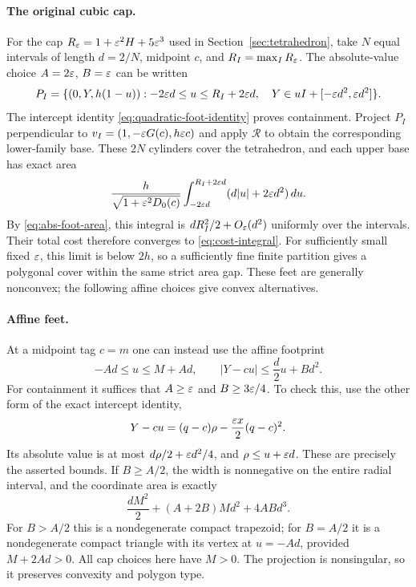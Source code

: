 \paragraph{The original cubic cap.}
For the cap $R_\varepsilon=1+\varepsilon^2H+5\varepsilon^3$ used in
Section~\ref{sec:tetrahedron}, take $N$ equal intervals of length $d=2/N$,
midpoint $c$, and $R_I=\max_I R_\varepsilon$. The absolute-value choice
$A=2\varepsilon$, $B=\varepsilon$ can be written
\begin{equation}\label{eq:polygonal-foot}
 P_I=\{(0,Y,h(1-u)):
    -2\varepsilon d\le u\le R_I+2\varepsilon d,\quad
    Y\in uI+[-\varepsilon d^2,\varepsilon d^2]\}.
\end{equation}
The intercept identity \eqref{eq:quadratic-foot-identity} proves containment.
Project $P_I$ perpendicular to $v_I=(1,-\varepsilon G(c),h\varepsilon c)$ and apply
$\mathcal R$ to obtain the corresponding lower-family base. These $2N$
cylinders cover the tetrahedron, and each upper base has exact area
\begin{equation}\label{eq:polygonal-area}
 \frac{h}{\sqrt{1+\varepsilon^2D_0(c)}}
 \int_{-2\varepsilon d}^{R_I+2\varepsilon d}(d|u|+2\varepsilon d^2)\,du.
\end{equation}
By \eqref{eq:abs-foot-area}, this integral is
$dR_I^2/2+O_\varepsilon(d^2)$ uniformly over the intervals. Their total cost
therefore converges to \eqref{eq:cost-integral}. For sufficiently small
fixed $\varepsilon$, this limit is below $2h$, so a sufficiently fine finite
partition gives a polygonal cover within the same strict area gap.
These feet are generally nonconvex;
the following affine choices give convex alternatives.

\paragraph{Affine feet.}
At a midpoint tag $c=m$ one can instead use the affine footprint
\begin{equation}\label{eq:midpoint-affine-foot}
 -Ad\le u\le M+Ad,\qquad
 |Y-cu|\le \frac d2u+Bd^2.
\end{equation}
For containment it suffices that $A\ge\varepsilon$ and $B\ge3\varepsilon/4$.
To check this, use the other form of the exact intercept identity,
\[
 Y-cu=(q-c)\rho-\frac{\varepsilon x}{2}(q-c)^2.
\]
Its absolute value is at most $d\rho/2+\varepsilon d^2/4$, and
$\rho\le u+\varepsilon d$. These are precisely the asserted bounds.
If $B\ge A/2$, the width is nonnegative on the entire radial interval,
and the coordinate area is exactly
\begin{equation}\label{eq:affine-foot-area}
 \frac{dM^2}{2}+(A+2B)Md^2+4ABd^3.
\end{equation}
For $B>A/2$ this is a nondegenerate compact trapezoid; for
$B=A/2$ it is a nondegenerate compact triangle with its vertex at
$u=-Ad$, provided $M+2Ad>0$. All cap choices here have $M>0$.
The projection is nonsingular, so it preserves convexity and polygon type.

